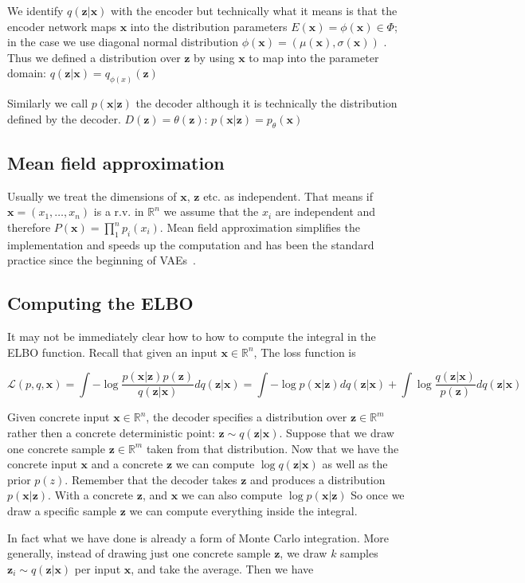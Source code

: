 \documentclass[11pt, a4paper]{report}
\theoremstyle{plain}
\theoremstyle{definition}
\theoremstyle{remark}
\newcommand{\R}{\mathbb{R}}
\newcommand{\x}{\mathbf{x}}
\newcommand{\z}{\mathbf{z}}
\newcommand{\LL}{\mathcal{L}}
\begin{document}
We identify $q(\z | \x)$ with the encoder but technically what it means is that 
the encoder network maps $\x$ into the distribution parameters $E(\x) = \phi(\x)
\in \Phi$;
in the case we use diagonal normal distribution $\phi(\x) = (\mu(\x), \sigma(\x))$
. Thus we defined a distribution over $\z$ by using $\x$ to map into
the parameter domain: $q(\z | \x) = q_{\phi(x)}(\z)$

Similarly we call $p(\x | \z)$ the decoder although it is
technically the distribution defined by the decoder. $D(\z) = \theta(\z)$:
$p(\x | \z) = p_{\theta}(\x)$


\subsection{Mean field approximation}
Usually we treat the dimensions of $\x$, $\z$ etc. as independent.
That means if $\x = (x_1, \dots, x_n)$ is a r.v. in $\R^n$ 
we assume that the $x_i$ are independent and therefore 
$P(\x) = \prod_1^n p_i(x_i)$.
Mean field approximation simplifies the implementation and speeds up the
computation and has been the standard practice since the
beginning of VAEs~\cite{kingma2013auto}.


\subsection{Computing the ELBO}
It may not be immediately clear how to how to compute the integral in the ELBO function. 
Recall that given an input $\x \in \R^n$,
The loss function is 

\begin{equation}
\LL(p,q,\x) = 
\int - \log \frac{p(\x|\z)p(\z)}{q(\z|\x)}dq(\z|\x)
= \int -\log p(\x|\z)dq(\z|\x) + \int \log \frac{q(\z|\x)}{p(\z)}dq(\z|\x)
\label{eq:elbovae}
\end{equation}

Given concrete input $\x \in \R^n$,
the decoder specifies a distribution over
$\z \in \R^m$ rather then a concrete deterministic point:
$\z \sim q(\z | \x)$. Suppose that we draw one concrete sample $\z \in \R^m$
taken from that distribution. Now that we have the concrete input $\x$ and a 
concrete $\z$ we can compute $\log q (\z | \x)$ as well as the prior $p(z)$.
Remember that the decoder takes $\z$ and produces a distribution $p(\x | \z)$.
With a concrete $\z$, and $\x$ we can also compute $\log p(\x | \z)$
So once we draw a specific sample $\z$ we can compute everything inside the
integral.

In fact what we have done is already a form of Monte Carlo integration.
More generally, instead of drawing just one concrete sample $\z$, we draw $k$ samples
$\z_i \sim q(\z | \x)$ per input $\x$, and take the average. Then we have
\end{document}
